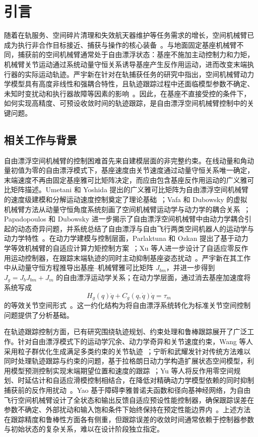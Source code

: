\section{引言}

随着在轨服务、空间碎片清理和失效航天器维护等任务需求的增长，空间机械臂已成为执行非合作目标接近、捕获与操作的核心装备~\cite{liu2021review}。与地面固定基座机械臂不同，捕获前的空间机械臂通常处于自由漂浮状态：基座不施加主动控制力和力矩，机械臂关节运动通过系统动量守恒关系诱导基座产生反作用运动，进而改变末端执行器的实际运动轨迹。严宇新在针对在轨捕获任务的研究中指出，空间机械臂动力学模型具有高度非线性和强耦合特性，且轨迹跟踪过程中还面临模型参数不确定、未知时变扰动和执行器故障等因素的影响~\cite{yan}。因此，在基座不直接受控的条件下，如何实现高精度、可预设收敛时间的轨迹跟踪，是自由漂浮空间机械臂控制中的关键问题。

\subsection{相关工作与背景}

自由漂浮空间机械臂的控制困难首先来自建模层面的非完整约束。在线动量和角动量初值为零的自由漂浮模式下，基座速度由关节速度通过动量守恒关系唯一确定，末端速度不再由固定基座雅可比矩阵决定，而应由包含基座反作用运动的广义雅可比矩阵描述。Umetani 和 Yoshida 提出的广义雅可比矩阵为自由漂浮空间机械臂的速度级建模和分解运动速度控制奠定了理论基础~\cite{umetani1989}；Vafa 和 Dubowsky 的虚拟机械臂方法从动量守恒角度系统刻画了空间机械臂运动学与动力学的耦合关系~\cite{vafa1990}；Papadopoulos 和 Dubowsky 进一步揭示了自由漂浮空间机械臂中由动力学耦合引起的动态奇异问题，并系统总结了自由漂浮与自由飞行两类空间机器人的运动学与动力学特性~\cite{papadopoulos1993,dubowsky1993}。在动力学建模与控制层面，Parlaktuna 和 Ozkan 提出了基于动力学等效机械臂的自适应计算力矩控制方案~\cite{parlaktuna2004}；Xu 等人进一步设计了自适应零反作用运动控制器，在跟踪末端轨迹的同时主动抑制基座姿态扰动~\cite{xu2016}。严宇新在其工作中从动量守恒方程推导出基座--机械臂雅可比矩阵 \(J_{bm}\)，并进一步得到 \(J_g=J_bJ_{bm}+J_m\) 的自由漂浮运动学关系；在动力学层面，通过消去基座加速度将系统写成
\[
H_g(q)\ddot q+C_g(q,\dot q)\dot q=\tau_m
\]
的等效关节空间形式~\cite{yan}。这一约化结构为将自由漂浮系统转化为标准关节空间控制问题提供了分析基础。

在轨迹跟踪控制方面，已有研究围绕轨迹规划、约束处理和鲁棒跟踪展开了广泛工作。针对自由漂浮模式下的运动学冗余、动力学奇异和关节速度约束，Wang 等人采用粒子群优化生成满足多类约束的关节轨迹~\cite{wang2015}；宁昕和武耀发针对传统方法难以同时处理轨迹跟踪与约束的问题，基于拉格朗日动力学构造扩展状态空间模型，利用模型预测控制实现末端期望位置和速度的跟踪~\cite{ning2019}；Yu 等人将反作用零空间规划、时延估计和自适应滑模控制相结合，在降低对精确动力学模型依赖的同时抑制捕获前的反作用扰动~\cite{yu2022}。Yao 基于障碍李雅普诺夫函数和径向基神经网络，为自由飞行空间机械臂设计了全状态和输出反馈自适应预设性能控制器，确保跟踪误差在参数不确定、外部扰动和输入饱和条件下始终保持在预定性能边界内~\cite{yao2021}。上述方法在跟踪精度和鲁棒性方面各有侧重，但跟踪误差的收敛时间通常依赖于控制器参数与初始状态的复杂关系，难以在设计阶段独立指定。

